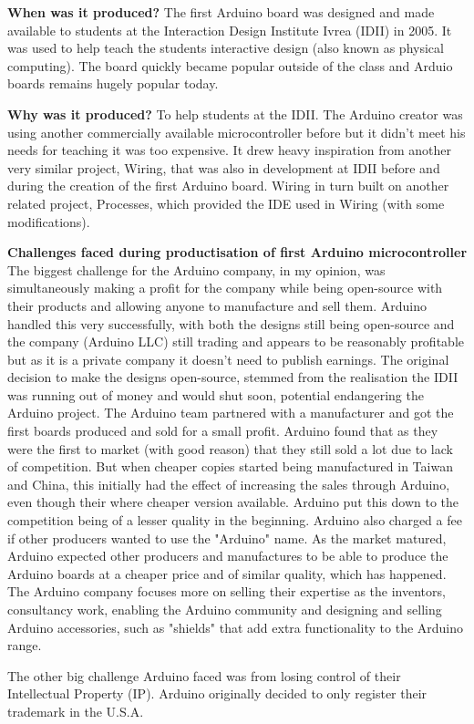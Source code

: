 \textbf{When was it produced?}
The first Arduino board was designed and made available to students at the Interaction Design Institute Ivrea (IDII) in 2005. It was used to help teach the students interactive design (also known as physical computing). The board quickly became popular outside of the class and Arduio boards remains hugely popular today.

\textbf{Why was it produced?}
To help students at the IDII. The Arduino creator was using another commercially available microcontroller before but it didn't meet his needs for teaching it was too expensive. It drew heavy inspiration from another very similar project, Wiring, that was also in development at IDII before and during the creation of the first Arduino board. Wiring in turn built on another related project, Processes, which provided the IDE used in Wiring (with some modifications). 

\textbf{Challenges faced during productisation of first Arduino microcontroller}
The biggest challenge for the Arduino company, in my opinion, was simultaneously making a profit for the company while being open-source with their products and allowing anyone to manufacture and sell them. Arduino handled this very successfully, with both the designs still being open-source and the company (Arduino LLC) still trading and appears to be reasonably profitable but as it is a private company it doesn't need to publish earnings. The original decision to make the designs open-source, stemmed from the realisation the IDII was running out of money and would shut soon, potential endangering the Arduino project. The Arduino team partnered with a manufacturer and got the first boards produced and sold for a small profit. Arduino found that as they were the first to market (with good reason) that they still sold a lot due to lack of competition. But when cheaper copies started being manufactured in Taiwan and China, this initially had the effect of increasing the sales through Arduino, even though their where cheaper version available. Arduino put this down to the competition being of a lesser quality in the beginning. Arduino also charged a fee if other producers wanted to use the "Arduino" name. As the market matured, Arduino expected other producers and manufactures to be able to produce the Arduino boards at a cheaper price and of similar quality, which has happened. The Arduino company focuses more on selling their expertise as the inventors, consultancy work, enabling the Arduino community and designing and selling Arduino accessories, such as "shields" that add extra functionality to the Arduino range.

The other big challenge Arduino faced was from losing control of their Intellectual Property (IP). Arduino originally decided to only register their trademark in the U.S.A. 